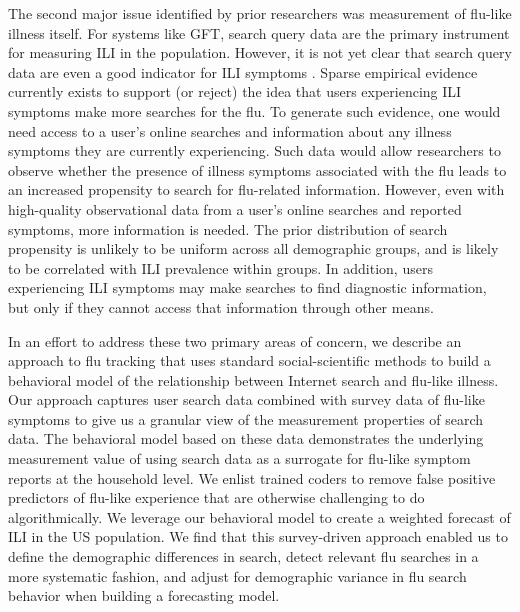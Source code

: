 \documentclass[fleqn,10pt]{wlscirep}
\begin{document}
The second major issue identified by prior researchers was measurement of flu-like illness itself. For systems like GFT, search query data are the primary instrument for measuring ILI in the population. However, it is not yet clear that search query data are even a good indicator for ILI symptoms \cite{lazer_etal_2014}. Sparse empirical evidence currently exists to support (or reject) the idea that users experiencing ILI symptoms make more searches for the flu. To generate such evidence, one would need access to a user's online searches and information about any illness symptoms they are currently experiencing. Such data would allow researchers to observe whether the presence of illness symptoms associated with the flu leads to an increased propensity to search for flu-related information. However, even with high-quality observational data from a user's online searches and reported symptoms, more information is needed. The prior distribution of search propensity is unlikely to be uniform across all demographic groups, and is likely to be correlated with ILI prevalence within groups. In addition, users experiencing ILI symptoms may make searches to find diagnostic information, but only if they cannot access that information through other means.

In an effort to address these two primary areas of concern, we describe an approach to flu tracking that uses standard social-scientific methods to build a behavioral model of the relationship between Internet search and flu-like illness. Our approach captures user search data combined with survey data of flu-like symptoms to give us a granular view of the measurement properties of search data. The behavioral model based on these data demonstrates the underlying measurement value of using search data as a surrogate for flu-like symptom reports at the household level. We enlist trained coders to remove false positive predictors of flu-like experience that are otherwise challenging to do algorithmically. We leverage our behavioral model to create a weighted forecast of ILI in the US population. We find that this survey-driven approach enabled us to define the demographic differences in search, detect relevant flu searches in a more systematic fashion, and adjust for demographic variance in flu search behavior when building a forecasting model.
\end{document}
